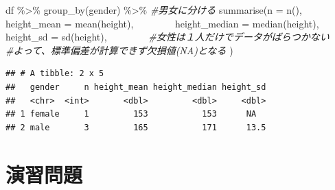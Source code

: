\documentclass[
]{book}
\newenvironment{Shaded}{\begin{snugshade}}{\end{snugshade}}
\newcommand{\AttributeTok}[1]{\textcolor[rgb]{0.77,0.63,0.00}{#1}}
\newcommand{\CommentTok}[1]{\textcolor[rgb]{0.56,0.35,0.01}{\textit{#1}}}
\newcommand{\FunctionTok}[1]{\textcolor[rgb]{0.00,0.00,0.00}{#1}}
\newcommand{\NormalTok}[1]{#1}
\newcommand{\SpecialCharTok}[1]{\textcolor[rgb]{0.00,0.00,0.00}{#1}}
\begin{document}
\begin{Shaded}
\begin{Highlighting}[]
\NormalTok{df }\SpecialCharTok{\%\textgreater{}\%}
  \FunctionTok{group\_by}\NormalTok{(gender) }\SpecialCharTok{\%\textgreater{}\%} \CommentTok{\#男女に分ける}
  \FunctionTok{summarise}\NormalTok{(}\AttributeTok{n =} \FunctionTok{n}\NormalTok{(),}
    　　　　\AttributeTok{height\_mean =} \FunctionTok{mean}\NormalTok{(height),}
    　　　　\AttributeTok{height\_median =} \FunctionTok{median}\NormalTok{(height),}
            \AttributeTok{height\_sd =} \FunctionTok{sd}\NormalTok{(height), }
    　　　　\CommentTok{\#女性は１人だけでデータがばらつかない}
    　　　　\CommentTok{\#よって、標準偏差が計算できず欠損値(NA)となる}
\NormalTok{            ) }
\end{Highlighting}
\end{Shaded}

\begin{verbatim}
## # A tibble: 2 x 5
##   gender     n height_mean height_median height_sd
##   <chr>  <int>       <dbl>         <dbl>     <dbl>
## 1 female     1         153           153      NA  
## 2 male       3         165           171      13.5
\end{verbatim}

\hypertarget{ux6f14ux7fd2ux554fux984c-4}{%
\section{演習問題}\label{ux6f14ux7fd2ux554fux984c-4}}

  
\end{document}

